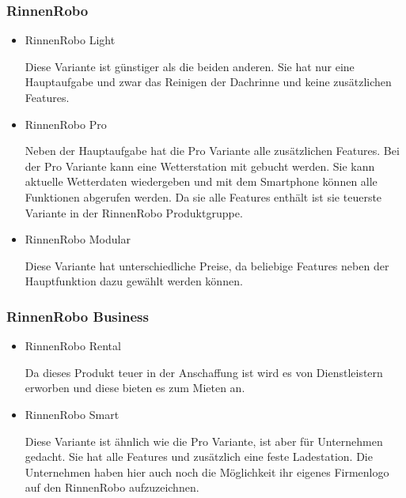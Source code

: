         \subsubsection{RinnenRobo}
            \begin{itemize}
                \item RinnenRobo Light
                
                    Diese Variante ist günstiger als die beiden anderen. Sie hat nur eine Hauptaufgabe und zwar das
                    Reinigen der Dachrinne und keine zusätzlichen Features. 

                \item RinnenRobo Pro
                
                    Neben der Hauptaufgabe hat die Pro Variante alle zusätzlichen Features. Bei der Pro Variante kann
                    eine Wetterstation mit gebucht werden. Sie kann aktuelle Wetterdaten wiedergeben und mit dem
                    Smartphone können alle Funktionen abgerufen werden. Da sie alle Features enthält ist sie teuerste
                    Variante in der RinnenRobo Produktgruppe. 

                \item RinnenRobo Modular
                
                    Diese Variante hat unterschiedliche Preise, da beliebige Features neben der Hauptfunktion dazu
                    gewählt werden können. 
            \end{itemize}

        \subsubsection{RinnenRobo Business}
            \begin{itemize}
                \item RinnenRobo Rental
                
                    Da dieses Produkt teuer in der Anschaffung ist wird es von Dienstleistern erworben und diese bieten
                    es zum Mieten an.  

                \item RinnenRobo Smart
                
                    Diese Variante ist ähnlich wie die Pro Variante, ist aber für Unternehmen gedacht. Sie hat alle
                    Features und zusätzlich eine feste Ladestation. Die Unternehmen haben hier auch noch die Möglichkeit
                    ihr eigenes Firmenlogo auf den RinnenRobo aufzuzeichnen. 
            \end{itemize}